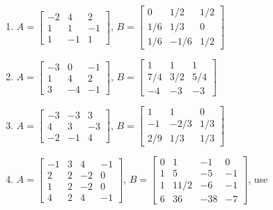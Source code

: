 \begin{exercise}
\begin{enumerate}
\item \(A=\begin{bmatrix} -2&4&2
\\1&1&-1
\\1&-1&1 \end{bmatrix}\), 
\(B=\begin{bmatrix} 0&1/2&1/2
\\1/6&1/3&0
\\1/6&-1/6&1/2 \end{bmatrix}\)

\item \(A=\begin{bmatrix} -3&0&-1
\\1&4&2
\\3&-4&-1 \end{bmatrix}\), 
\(B=\begin{bmatrix} 1&1&1
\\7/4&3/2&5/4
\\-4&-3&-3 \end{bmatrix}\)

\item \(A=\begin{bmatrix} -3&-3&3
\\4&3&-3
\\-2&-1&4 \end{bmatrix}\), 
\(B=\begin{bmatrix} 1&1&0
\\-1&-2/3&1/3
\\2/9&1/3&1/3 \end{bmatrix}\)


\item \(A=\begin{bmatrix} -1&3&4&-1
\\2&2&-2&0
\\1&2&-2&0
\\4&2&4&-1 \end{bmatrix}\), 
\setbox\ajrqrbox\hbox{}%
\marginpar{\usebox{\ajrqrbox}}%
\(B=\begin{bmatrix} 0&1&-1&0
\\1&5&-5&-1
\\1&11/2&-6&-1
\\6&36&-38&-7 \end{bmatrix}\), use \script
{}


\end{enumerate}
\end{exercise}
